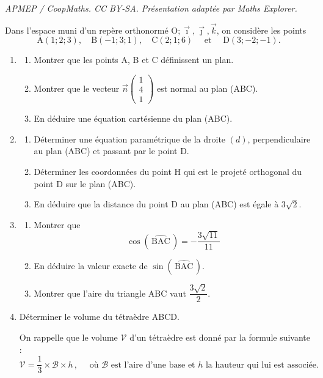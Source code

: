 \documentclass[10pt]{article}
\providecommand{\vect}[1]{\overrightarrow{#1}}
\providecommand{\Oijk}{\(\mathrm{O};\vec{\imath},\vec{\jmath},\vec{k}\)}
\begin{document}
\noindent\textit{APMEP / CoopMaths. CC BY-SA. Présentation adaptée par Maths Explorer.}\par\medskip
Dans l'espace muni d'un repère orthonormé \Oijk, on considère les points
\[\mathrm{A}(1 ; 2 ; 3),\quad \mathrm{B}(-1 ; 3 ; 1),\quad \mathrm{C}(2 ; 1 ; 6) \quad \text { et } \quad \mathrm{D}(3 ;-2 ;-1).\]

	\begin{enumerate}
		\item \begin{enumerate}
			\item Montrer que les points A, B et C définissent un plan.

			\item Montrer que le vecteur $\vect{n}\begin{pmatrix} 1 \\ 4 \\ 1 \end{pmatrix}$ est normal au plan (ABC).

			\item  En déduire une équation cartésienne du plan (ABC).
		\end{enumerate}

		\item \begin{enumerate}
			\item Déterminer une équation paramétrique de la droite $(d)$, perpendiculaire au plan (ABC) et passant par le point D.

			\item Déterminer les coordonnées du point H qui est le projeté orthogonal du point D sur le plan (ABC).

			\item En déduire que la distance du point D au plan (ABC) est égale à $3\sqrt{2}$.
		\end{enumerate}

		\item \begin{enumerate}
			\item Montrer que
			\[\cos\left(\,\widehat{\mathrm{BAC}}\,\right)=-\dfrac{3\sqrt{11}}{11}\]

			\item En déduire la valeur exacte de $\sin\left(\,\widehat{\mathrm{BAC}}\,\right)$.

			\item Montrer que l'aire du triangle ABC vaut $\dfrac{3\sqrt{2}}{2}$.
		\end{enumerate}

		\item Déterminer le volume du tétraèdre ABCD.

		On rappelle que le volume $\mathcal{V}$ d'un tétraèdre est donné par la formule suivante :
		\[\mathcal{V}=\dfrac{1}{3}\times\mathcal{B}\times h\, ,\quad \text{ où } \mathcal{B}\text{ est l'aire d'une base et } h\text{ la hauteur qui lui est associée.}\]
	\end{enumerate}
\end{document}
